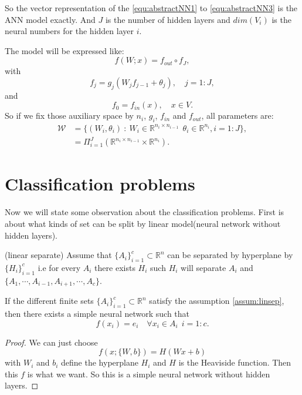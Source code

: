 So the vector representation of the \ref{equ:abstractNN1} to \ref{equ:abstractNN3} is the ANN model exactly. And $J$ is the number of hidden layers and $dim(V_i)$ is the neural numbers for the hidden layer $i$. 

The model will be expressed like:
\begin{equation}\label{equ:repNN1}
f(W;x) = f_{out}\circ f_J,
\end{equation}
with
\begin{equation}\label{equ:repNN2}
f_j = g_j(W_jf_{j-1} + \theta_j), \quad j = 1:J,
\end{equation}
and
\begin{equation}\label{equ:repNN3}
f_0 = f_{in}(x), \quad x \in V.
\end{equation}
So if we fix those auxiliary space by $n_i$, $g_i$, $f_{in}$ and $f_{out}$, all parameters are:
\begin{align}
\mathcal{W} &= \{ (W_i, \theta_i) ~ :  ~ W_i \in \mathbb{R}^{n_{i} \times n_{i-1}} ~ ~\theta_i \in \mathbb{R}^{n_i}, i = 1:J \}, \\
&= \Pi_{i=1}^J ( \mathbb{R}^{n_{i} \times n_{i-1}} \times  \mathbb{R}^{n_i}).
\end{align}


\section{Classification problems}
Now we will state some observation about the classification problems. First is about what kinds of set can be split by linear model(neural network without hidden layers).
\begin{definition}(linear separate)\label{assum:linsep}
Assume that $\{A_i\}_{i=1}^c \subset \mathbb{R}^n$ can be separated by hyperplane by $\{H_i\}_{i=1}^c$ i.e for every $A_i$ there exists $H_i$ such $H_i$ will separate $A_i$ and $\{A_1, \cdots, A_{i-1}, A_{i+1}, \cdots, A_c\}$.
\end{definition}
\begin{lemma}
If the different finite sets $\{A_i\}_{i=1}^c \subset \mathbb{R}^n$ satisfy the assumption \ref{assum:linsep}, then there exists a simple neural network such that 
\begin{equation}
f(x_i) = e_i \quad \forall x_i \in A_i ~~ i= 1:c.
\end{equation}
\end{lemma}
\begin{proof}We can just choose 
\begin{equation}
f(x; \{W,b\})  = H(Wx + b)
\end{equation}
with $W_i$ and $b_i$ define the hyperplane $H_i$ and $H$ is the Heaviside function. Then this $f$ is what we want. So this is a simple neural network without hidden layers.
\end{proof}

